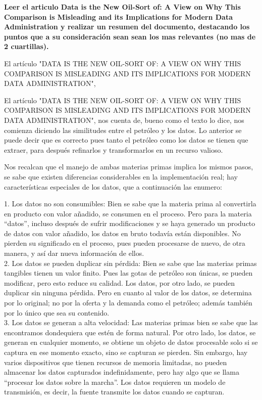\begin{center}
\textbf{Leer el articulo Data is the New Oil-Sort of: A View on Why This Comparison is Misleading and its Implications for Modern Data Administration y realizar un resumen del documento, destacando los puntos que a su consideración sean sean los mas relevantes (no mas de 2 cuartillas).} \\
\end{center}

El artículo "DATA IS THE NEW OIL-SORT OF: A VIEW ON WHY THIS COMPARISON IS MISLEADING AND ITS IMPLICATIONS FOR MODERN DATA ADMINISTRATION", 

El artículo "DATA IS THE NEW OIL-SORT OF: A VIEW ON WHY THIS COMPARISON IS MISLEADING AND ITS IMPLICATIONS FOR MODERN DATA ADMINISTRATION", nos cuenta de, bueno como el texto lo dice, nos comienza diciendo las similitudes entre el petróleo y los datos. Lo anterior se puede decir que es correcto pues tanto el petróleo como los datos se tienen que extraer, para después refinarlos y transformarlos en un recurso valioso.

Nos recalcan que el manejo de ambas materias primas implica los mismos pasos, se sabe que existen diferencias considerables en la implementación real; hay características especiales de los datos, que a continuación las enumero:

1.	Los datos no son consumibles: Bien se sabe que la materia prima al convertirla en producto con valor añadido, se consumen en el proceso. Pero para la materia “datos”, incluso después de sufrir modificaciones y se haya generado un producto de datos con valor añadido, los datos en bruto todavía están disponibles. 
No pierden su significado en el proceso, pues pueden procesarse de nuevo, de otra manera, y así dar nueva información de ellos. \\

2.	Los datos se pueden duplicar sin pérdida: Bien se sabe que las materias primas tangibles tienen un valor finito. Pues las gotas de petróleo son únicas, se pueden modificar, pero esto reduce su calidad. 
Los datos, por otro lado, se pueden duplicar sin ninguna pérdida. Pero en cuanto al valor de los datos, se determina por lo original; no por la oferta y la demanda como el petróleo; además también por lo único que sea su contenido. \\

3.	Los datos se generan a alta velocidad: Las materias primas bien se sabe que las encontramos dondequiera que estén de forma natural. 
Por otro lado, los datos, se generan en cualquier momento, se obtiene un objeto de datos procesable solo si se captura en ese momento exacto, sino se capturan se pierden. Sin embargo, hay varios dispositivos que tienen recursos de memoria limitadas, no pueden almacenar los datos capturados indefinidamente, pero hay algo que se llama “procesar los datos sobre la marcha”. 
Los datos requieren un modelo de transmisión, es decir, la fuente transmite los datos cuando se capturan.


